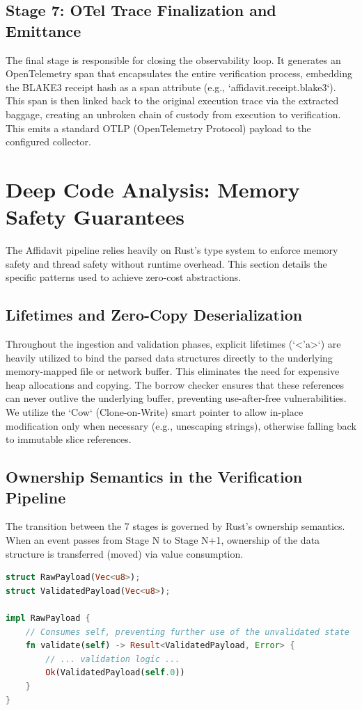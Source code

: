 \subsection{Stage 7: OTel Trace Finalization and Emittance}
The final stage is responsible for closing the observability loop. It generates an OpenTelemetry span that encapsulates the entire verification process, embedding the BLAKE3 receipt hash as a span attribute (e.g., `affidavit.receipt.blake3`). This span is then linked back to the original execution trace via the extracted baggage, creating an unbroken chain of custody from execution to verification. This emits a standard OTLP (OpenTelemetry Protocol) payload to the configured collector.

\section{Deep Code Analysis: Memory Safety Guarantees}
The Affidavit pipeline relies heavily on Rust's type system to enforce memory safety and thread safety without runtime overhead. This section details the specific patterns used to achieve zero-cost abstractions.

\subsection{Lifetimes and Zero-Copy Deserialization}
Throughout the ingestion and validation phases, explicit lifetimes (`<'a>`) are heavily utilized to bind the parsed data structures directly to the underlying memory-mapped file or network buffer. This eliminates the need for expensive heap allocations and copying. The borrow checker ensures that these references can never outlive the underlying buffer, preventing use-after-free vulnerabilities. We utilize the `Cow` (Clone-on-Write) smart pointer to allow in-place modification only when necessary (e.g., unescaping strings), otherwise falling back to immutable slice references.

\subsection{Ownership Semantics in the Verification Pipeline}
The transition between the 7 stages is governed by Rust's ownership semantics. When an event passes from Stage N to Stage N+1, ownership of the data structure is transferred (moved) via value consumption.

\begin{lstlisting}[language=Rust, caption={Typestate enforcement via ownership transfer}]
struct RawPayload(Vec<u8>);
struct ValidatedPayload(Vec<u8>);

impl RawPayload {
    // Consumes self, preventing further use of the unvalidated state
    fn validate(self) -> Result<ValidatedPayload, Error> {
        // ... validation logic ...
        Ok(ValidatedPayload(self.0))
    }
}
\end{lstlisting}

